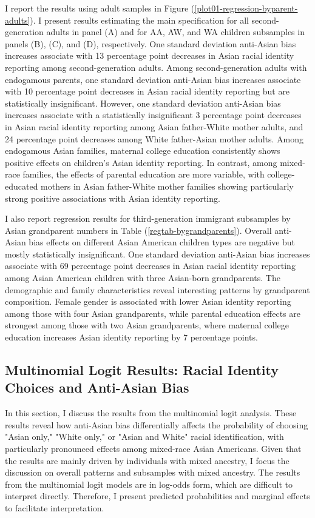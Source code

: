 I report the results using adult samples in Figure (\ref{plot01-regression-byparent-adults}). I present results estimating the main specification for all second-generation adults in panel (A) and for AA, AW, and WA children subsamples in panels (B), (C), and (D), respectively. One standard deviation anti-Asian bias increases associate with 13 percentage point decreases in Asian racial identity reporting among second-generation adults. Among second-generation adults with endogamous parents, one standard deviation anti-Asian bias increases associate with 10 percentage point decreases in Asian racial identity reporting but are statistically insignificant. However, one standard deviation anti-Asian bias increases associate with a statistically insignificant 3 percentage point decreases in Asian racial identity reporting among Asian father-White mother adults, and 24 percentage point decreases among White father-Asian mother adults. Among endogamous Asian families, maternal college education consistently shows positive effects on children's Asian identity reporting. In contrast, among mixed-race families, the effects of parental education are more variable, with college-educated mothers in Asian father-White mother families showing particularly strong positive associations with Asian identity reporting.

I also report regression results for third-generation immigrant subsamples by Asian grandparent numbers in Table (\ref{regtab-bygrandparents}). Overall anti-Asian bias effects on different Asian American children types are negative but mostly statistically insignificant. One standard deviation anti-Asian bias increases associate with 69 percentage point decreases in Asian racial identity reporting among Asian American children with three Asian-born grandparents. The demographic and family characteristics reveal interesting patterns by grandparent composition. Female gender is associated with lower Asian identity reporting among those with four Asian grandparents, while parental education effects are strongest among those with two Asian grandparents, where maternal college education increases Asian identity reporting by 7 percentage points.

\subsection*{Multinomial Logit Results: Racial Identity Choices and Anti-Asian Bias} \label{sec:multinomial}

In this section, I discuss the results from the multinomial logit analysis. These results reveal how anti-Asian bias differentially affects the probability of choosing "Asian only," "White only," or "Asian and White" racial identification, with particularly pronounced effects among mixed-race Asian Americans. Given that the results are mainly driven by individuals with mixed ancestry, I focus the discussion on overall patterns and subsamples with mixed ancestry. The results from the multinomial logit models are in log-odds form, which are difficult to interpret directly. Therefore, I present predicted probabilities and marginal effects to facilitate interpretation.

